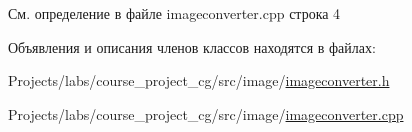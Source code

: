 См. определение в файле imageconverter.\+cpp строка 4



Объявления и описания членов классов находятся в файлах\+:\begin{DoxyCompactItemize}
\item 
Projects/labs/course\+\_\+project\+\_\+cg/src/image/\hyperlink{imageconverter_8h}{imageconverter.\+h}\item 
Projects/labs/course\+\_\+project\+\_\+cg/src/image/\hyperlink{imageconverter_8cpp}{imageconverter.\+cpp}\end{DoxyCompactItemize}
